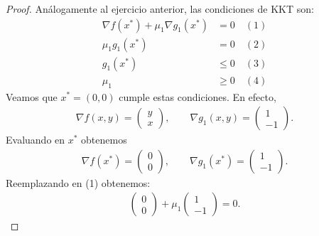 \documentclass{article}
\begin{document}
\begin{proof}
    Análogamente al ejercicio anterior, las condiciones de KKT son: \begin{align*}
        \nabla f(x^*) + \mu_1 \nabla g_1(x^*) & = 0 \quad (1)    \\
        \mu_1 g_1(x^*)                        & = 0 \quad (2)    \\
        g_1(x^*)                              & \leq 0 \quad (3) \\
        \mu_1                                 & \geq 0 \quad (4)
    \end{align*}
    Veamos que \( x^* = (0, 0) \) cumple estas condiciones. En efecto, \begin{align*}
        \nabla f(x, y)   = \begin{pmatrix}
                               y \\
                               x
                           \end{pmatrix}, \qquad
        \nabla g_1(x, y) = \begin{pmatrix}
                               1 \\
                               -1
                           \end{pmatrix}.
    \end{align*}
    Evaluando en \( x^* \) obtenemos \begin{align*}
        \nabla f(x^*)  = \begin{pmatrix}
                             0 \\
                             0
                         \end{pmatrix}, \qquad
        \nabla g_1(x^*) = \begin{pmatrix}
                              1 \\
                              -1
                          \end{pmatrix}.
    \end{align*}
    Reemplazando en (1) obtenemos: \begin{align*}
        \begin{pmatrix}
            0 \\
            0
        \end{pmatrix} + \mu_1 \begin{pmatrix}
                                  1 \\
                                  -1
                              \end{pmatrix} = 0.

\end{align*}
\end{proof}
\end{document}
